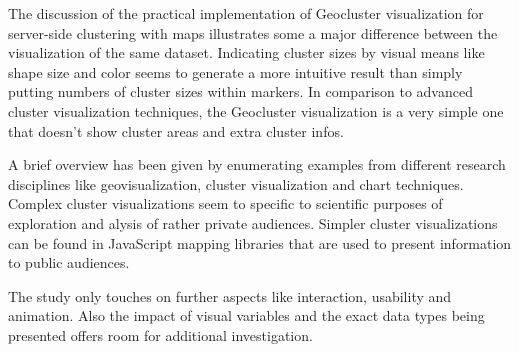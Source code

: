 The discussion of the practical implementation of Geocluster visualization for server-side clustering with maps illustrates some a major difference between the visualization of the same dataset. Indicating cluster sizes by visual means like shape size and color seems to generate a more intuitive result than simply putting numbers of cluster sizes within markers. In comparison to advanced cluster visualization techniques, the Geocluster visualization is a very simple one that doesn't show cluster areas and extra cluster infos.

A brief overview has been given by enumerating examples from different research disciplines like geovisualization, cluster visualization and chart techniques. Complex cluster visualizations seem to specific to scientific purposes of exploration and alysis of rather private audiences. Simpler cluster visualizations can be found in JavaScript mapping libraries that are used to present information to public audiences.

The study only touches on further aspects like interaction, usability and animation. Also the impact of visual variables and the exact data types being presented offers room for additional investigation. 



